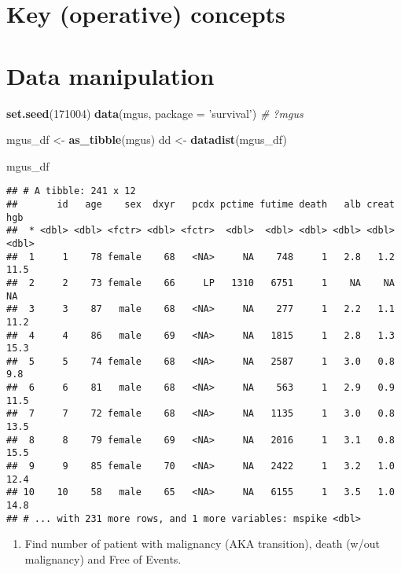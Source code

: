 \documentclass[]{book}
\newenvironment{Shaded}{\begin{snugshade}}{\end{snugshade}}
\newcommand{\KeywordTok}[1]{\textcolor[rgb]{0.13,0.29,0.53}{\textbf{{#1}}}}
\newcommand{\DataTypeTok}[1]{\textcolor[rgb]{0.13,0.29,0.53}{{#1}}}
\newcommand{\DecValTok}[1]{\textcolor[rgb]{0.00,0.00,0.81}{{#1}}}
\newcommand{\StringTok}[1]{\textcolor[rgb]{0.31,0.60,0.02}{{#1}}}
\newcommand{\CommentTok}[1]{\textcolor[rgb]{0.56,0.35,0.01}{\textit{{#1}}}}
\newcommand{\NormalTok}[1]{{#1}}
\providecommand{\tightlist}{%
  \setlength{\itemsep}{0pt}\setlength{\parskip}{0pt}}
\theoremstyle{definition}
\theoremstyle{definition}
\theoremstyle{definition}
\theoremstyle{remark}
\begin{document}
\section{Key (operative) concepts}\label{key3}

\section{Data manipulation}\label{data-manipulation}

\begin{Shaded}
\begin{Highlighting}[]
\KeywordTok{set.seed}\NormalTok{(}\DecValTok{171004}\NormalTok{)}
\KeywordTok{data}\NormalTok{(mgus, }\DataTypeTok{package =} \StringTok{'survival'}\NormalTok{)}
\CommentTok{# ?mgus}

\NormalTok{mgus_df <-}\StringTok{ }\KeywordTok{as_tibble}\NormalTok{(mgus)}
\NormalTok{dd <-}\StringTok{ }\KeywordTok{datadist}\NormalTok{(mgus_df)}

\NormalTok{mgus_df}
\end{Highlighting}
\end{Shaded}

\begin{verbatim}
## # A tibble: 241 x 12
##       id   age    sex  dxyr   pcdx pctime futime death   alb creat   hgb
##  * <dbl> <dbl> <fctr> <dbl> <fctr>  <dbl>  <dbl> <dbl> <dbl> <dbl> <dbl>
##  1     1    78 female    68   <NA>     NA    748     1   2.8   1.2  11.5
##  2     2    73 female    66     LP   1310   6751     1    NA    NA    NA
##  3     3    87   male    68   <NA>     NA    277     1   2.2   1.1  11.2
##  4     4    86   male    69   <NA>     NA   1815     1   2.8   1.3  15.3
##  5     5    74 female    68   <NA>     NA   2587     1   3.0   0.8   9.8
##  6     6    81   male    68   <NA>     NA    563     1   2.9   0.9  11.5
##  7     7    72 female    68   <NA>     NA   1135     1   3.0   0.8  13.5
##  8     8    79 female    69   <NA>     NA   2016     1   3.1   0.8  15.5
##  9     9    85 female    70   <NA>     NA   2422     1   3.2   1.0  12.4
## 10    10    58   male    65   <NA>     NA   6155     1   3.5   1.0  14.8
## # ... with 231 more rows, and 1 more variables: mspike <dbl>
\end{verbatim}

\begin{enumerate}
\def\labelenumi{\arabic{enumi}.}
\tightlist
\item
  Find number of patient with malignancy (AKA transition), death (w/out
  malignancy) and Free of Events.
\end{enumerate}
\end{document}
